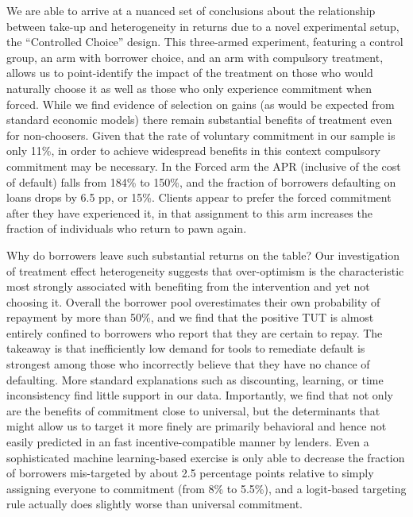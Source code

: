 \documentclass[oneside,11pt]{article}
\begin{document}
We are able to arrive at a nuanced set of conclusions about the relationship between take-up and heterogeneity in returns due to a novel experimental setup, the ``Controlled Choice'' design.  This three-armed experiment, featuring a control group, an arm with borrower choice, and an arm with compulsory treatment, allows us to point-identify the impact of the treatment on those who would naturally choose it as well as those who only experience commitment when forced.  While we find evidence of selection on gains (as would be expected from standard economic models) there remain substantial benefits of treatment even for non-choosers.  Given that the rate of voluntary commitment in our sample is only 11\%, in order to achieve widespread benefits in this context compulsory commitment may be necessary. In the Forced arm the APR (inclusive of the cost of default) falls from 184\% to 150\%, and the fraction of borrowers defaulting on loans drops by 6.5 pp, or 15\%. Clients appear to prefer the forced commitment after they have experienced it, in that assignment to this arm increases the fraction of individuals who return to pawn again.

Why do borrowers leave such substantial returns on the table? Our investigation of treatment effect heterogeneity suggests that over-optimism is the characteristic most strongly associated with benefiting from the intervention and yet not choosing it.  Overall the borrower pool overestimates their own probability of repayment by more than 50\%, and we find that the positive TUT is almost entirely confined to borrowers who report that they are certain to repay. The takeaway is that inefficiently low demand for tools to remediate default is strongest among those who incorrectly believe that they have no chance of defaulting.  More standard explanations such as discounting, learning, or time inconsistency find little support in our data.  Importantly, we find that not only are the benefits of commitment close to universal, but the determinants that might allow us to target it more finely are primarily behavioral and hence not easily predicted in an fast incentive-compatible manner by lenders.  Even a sophisticated machine learning-based exercise is only able to decrease the fraction of borrowers mis-targeted by about 2.5 percentage points relative to simply assigning everyone to commitment (from 8\% to 5.5\%), and a logit-based targeting rule actually does slightly worse than universal commitment.  
\end{document}
